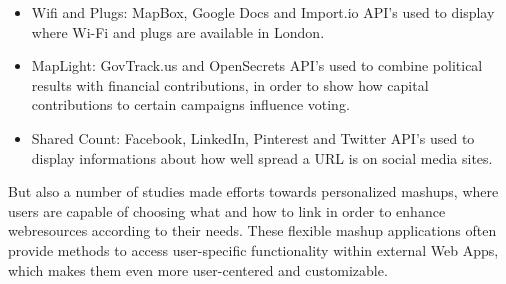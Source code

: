 \begin{itemize}
  \item \textrm{Wifi and Plugs}: MapBox, Google Docs and Import.io API's used to display where Wi-Fi and plugs are available in London.
  \item \textrm{MapLight}: GovTrack.us and OpenSecrets API's used to combine political results with financial contributions, in order to show how capital contributions to certain campaigns influence voting.
  \item \textrm{Shared Count}: Facebook, LinkedIn, Pinterest and Twitter API's used to display informations about how well spread a URL is on social media sites.
\end{itemize}

But also a number of studies\cite{10.1007/978-3-642-22233-7_11}\cite{4278815}\cite{Rizzotti:2010:UST:1772690.1772861}\cite{Stolee20131289} made efforts towards personalized \textrm{\glspl{mashup}}, where users are capable of choosing what and how to link in order to enhance \textrm{\glspl{webresource}} according to their needs.
These flexible \textrm{\gls{mashup}} applications often provide methods to access user-specific functionality within external \textrm{Web Apps}, which makes them even more user-centered and customizable.


